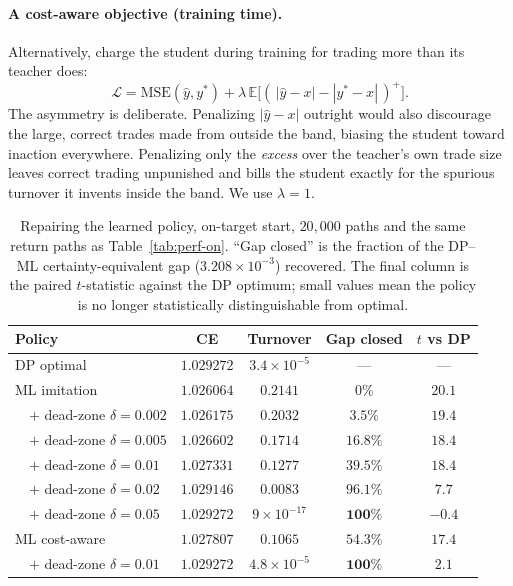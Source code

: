 \documentclass[11pt]{article}
\newcommand{\E}{\mathbb{E}}
\begin{document}
\paragraph{A cost-aware objective (training time).}
Alternatively, charge the student during training for trading more than its
teacher does:
\begin{equation}
\mathcal{L}=\mathrm{MSE}(\hat y,y^{*})
+\lambda\,\E\big[(\,|\hat y-x|-|y^{*}-x|\,)^{+}\big].
\label{eq:costaware}
\end{equation}
The asymmetry is deliberate. Penalizing $|\hat y-x|$ outright would also
discourage the large, correct trades made from outside the band, biasing the
student toward inaction everywhere. Penalizing only the \emph{excess} over the
teacher's own trade size leaves correct trading unpunished and bills the student
exactly for the spurious turnover it invents inside the band. We use
$\lambda=1$.

\begin{table}[t]
\centering
\caption{Repairing the learned policy, on-target start, $20{,}000$ paths and the
same return paths as Table~\ref{tab:perf-on}. ``Gap closed'' is the fraction of
the DP--ML certainty-equivalent gap ($3.208\times10^{-3}$) recovered. The final
column is the paired $t$-statistic against the DP optimum; small values mean the
policy is no longer statistically distinguishable from optimal.}
\label{tab:remedies}
\small
\begin{tabular}{lcccc}
\toprule
Policy & CE & Turnover & Gap closed & $t$ vs DP\\
\midrule
DP optimal                     & $1.029272$ & $3.4\!\times\!10^{-5}$ & ---      & ---\\
ML imitation                   & $1.026064$ & $0.2141$               & $0\%$    & $20.1$\\
\midrule
\ \ $+$ dead-zone $\delta=0.002$ & $1.026175$ & $0.2032$             & $3.5\%$  & $19.4$\\
\ \ $+$ dead-zone $\delta=0.005$ & $1.026602$ & $0.1714$             & $16.8\%$ & $18.4$\\
\ \ $+$ dead-zone $\delta=0.01$  & $1.027331$ & $0.1277$             & $39.5\%$ & $18.4$\\
\ \ $+$ dead-zone $\delta=0.02$  & $1.029146$ & $0.0083$             & $96.1\%$ & $7.7$\\
\ \ $+$ dead-zone $\delta=0.05$  & $\mathbf{1.029272}$ & $9\!\times\!10^{-17}$ & $\mathbf{100\%}$ & $\mathbf{-0.4}$\\
\midrule
ML cost-aware                  & $1.027807$ & $0.1065$               & $54.3\%$ & $17.4$\\
\ \ $+$ dead-zone $\delta=0.01$  & $\mathbf{1.029272}$ & $4.8\!\times\!10^{-5}$ & $\mathbf{100\%}$ & $2.1$\\
\bottomrule
\end{tabular}
\end{table}
\end{document}
